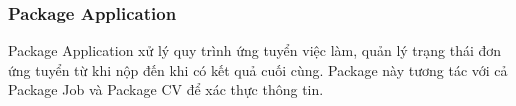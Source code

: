 %
%
%
%
%

\subsubsection{Package Application}

Package Application xử lý quy trình ứng tuyển việc làm, quản lý trạng thái đơn ứng tuyển từ khi nộp đến khi có kết quả cuối cùng. Package này tương tác với cả Package Job và Package CV để xác thực thông tin.

%
%
%
%
%

